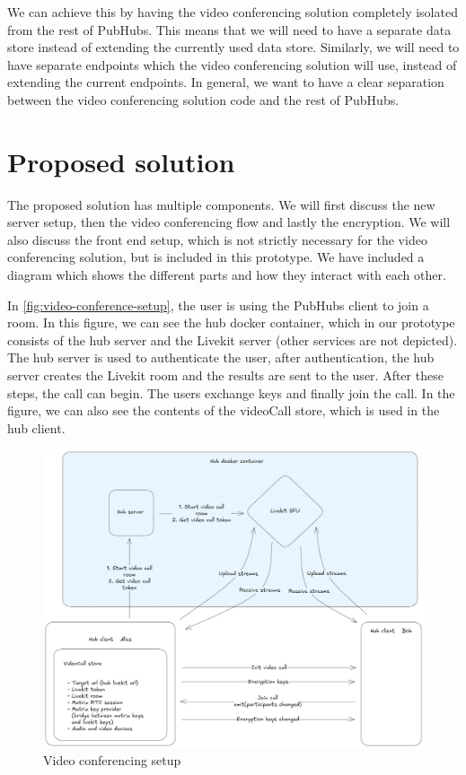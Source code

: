 \documentclass{report}
\begin{document}
We can achieve this by having the video conferencing solution completely isolated from the rest of PubHubs.
This means that we will need to have a separate data store instead of extending the currently used data store.
Similarly, we will need to have separate endpoints which the video conferencing solution will use,
instead of extending the current endpoints. In general, we want to have a clear separation between the video conferencing
solution code and the rest of PubHubs.

\chapter{Proposed solution}
The proposed solution has multiple components. We will first discuss the new server setup, then the video conferencing
flow and lastly the encryption. We will also discuss the front end setup, which is not strictly necessary for the video
conferencing solution, but is included in this prototype. We have included a diagram which shows the different parts
and how they interact with each other.

In \autoref{fig:video-conference-setup}, the user is using the PubHubs client to join a room. In this figure, we can see
the hub docker container, which in our prototype consists of the hub server and the Livekit server (other services
are not depicted). The hub server is used to authenticate the user, after authentication, the hub server creates the
Livekit room and the results are sent to the user. After these steps, the call can begin. The users exchange keys
and finally join the call. In the figure, we can also see the contents of the videoCall store, which is used in the hub
client.

\begin{figure}[!hbt]
\centering
\includegraphics[width=1\textwidth]{img/PH_videocall.excalidraw.png}
\caption{Video conferencing setup}
\label{fig:video-conference-setup}
\end{figure}
\end{document}
